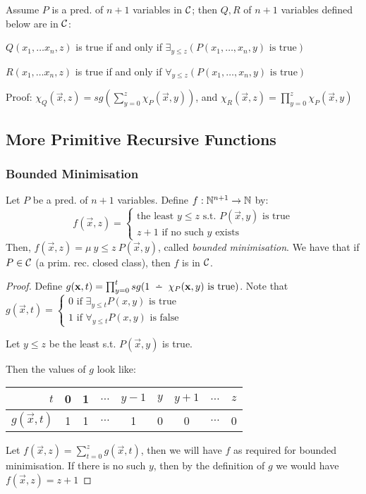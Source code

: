 \begin{itemize}
	Assume $ P $ is a pred. of $ n + 1 $ variables in $ \mathcal{C} $; then $ Q, R $ of $ n + 1 $ variables defined below are in $ \mathcal{C} $:
	
	$ Q(x_1, \dots x_n, z) $ is true if and only if $ \exists_{y \le z} (P(x_1, \dots, x_n, y) \text{ is true})$
	
	$ R(x_1, \dots x_n, z) $ is true if and only if $ \forall_{y \le z} (P(x_1, \dots, x_n, y) \text{ is true})$
	
	\subitem Proof: $ \chi_Q (\vec{x}, z) = sg(\sum_{y=0}^{z} \chi_P(\vec{x}, y)) $, and $ \chi_R (\vec{x}, z) = \prod_{y=0}^{z} \chi_P(\vec{x}, y) $
	
\end{itemize}

\subsection{More Primitive Recursive Functions}

\subsubsection{Bounded Minimisation}

Let $ P $ be a pred. of $ n + 1 $ variables. Define $ f: \mathbb{N}^{n+1} \to \mathbb{N} $ by:
\begin{equation*}
f(\vec{x}, z) = \begin{cases}
\text{the least } y \le z \text{ s.t. } P(\vec{x}, y) \text{ is true}\\
z + 1 \text{ if no such } y \text{ exists}
\end{cases}
\end{equation*}
Then, $ f(\vec{x}, z) = \mu ~ {y \le z} ~ P(\vec{x}, y) $, called \textit{bounded minimisation}. We have that if $ P \in \mathcal{C}$ (a prim. rec. closed class), then $ f $ is in $ \mathcal{C} $.

\begin{proof}
	
Define $ g(\vec{x}, t) = \prod_{y=0}^{t} sg(1 \monus \chi_P(\vec{x}, y) \text{ is true})$. Note that $ g(\vec{x}, t) =  \begin{cases}
0 \text{ if } \exists_{y \le t} P(x, y) \text{ is true}\\
1 \text{ if } \forall_{y \le t} P(x, y) \text{ is false}
\end{cases} $

Let $ y \le z $ be the least s.t. $ P(\vec{x}, y) $ is true.

Then the values of $ g $ look like: \begin{tabular}{r | c c c c c c c c}
	$ t $ & 0 & 1 & $ \dots $ & $ y - 1 $ & $ y $ & $ y + 1 $ & $ \dots $ & $ z $ \\ \hline
	$ g(\vec{x}, t) $ & 1 & 1 & $ \dots $ & 1 & 0 & 0 & $ \dots $ & 0 
\end{tabular}

Let $ f(\vec{x}, z) = \sum_{t=0}^{z} g(\vec{x}, t) $, then we will have $ f $ as required for bounded minimisation. If there is no such $ y $, then by the definition of $ g $ we would have $ f(\vec{x}, z) = z + 1 $

\end{proof}

